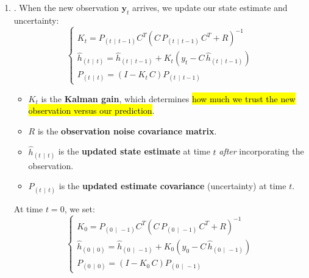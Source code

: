 \begin{enumerate}
    \item {}. When the new observation $\mathbf{y}_t$ arrives, we update our state estimate and uncertainty:
    \begin{equation}
        \begin{cases}
            K_t = P_{\left(t \, \mid \, t-1\right)} C^{T} \left( C \, P_{\left(t \, \mid \, t-1\right)} \, C^{T} + R \right)^{-1} \\[.3em]
            \hat{h}_{\left(t \, \mid \, t\right)} = \hat{h}_{\left(t \, \mid \, t-1\right)} + K_t \left( y_t - C \, \hat{h}_{\left(t \, \mid \, t-1\right)} \right) \\[.3em]
            P_{\left(t \, \mid \, t\right)} = \left( I - K_t \, C \right) P_{\left(t \, \mid \, t-1\right)}
        \end{cases}
    \end{equation}
    \begin{itemize}
        \item $K_t$ is the \textbf{Kalman gain}, which determines \hl{how much we trust the new observation versus our prediction}.
        \item $R$ is the \textbf{observation noise covariance matrix}.
        \item $\hat{h}_{\left(t \, \mid \, t\right)}$ is the \textbf{updated state estimate} at time $t$ \emph{after} incorporating the observation.
        \item $P_{\left(t \, \mid \, t\right)}$ is the \textbf{updated estimate covariance} (uncertainty) at time $t$.
    \end{itemize}
    At time $t=0$, we set:
    \begin{equation*}
        \begin{cases}
            K_0 = P_{\left(0 \, \mid \, -1\right)} C^{T} \left( C \, P_{\left(0 \, \mid \, -1\right)} \, C^{T} + R \right)^{-1} \\[.3em]
            \hat{h}_{\left(0 \, \mid \, 0\right)} = \hat{h}_{\left(0 \, \mid \, -1\right)} + K_0 \left( y_0 - C \, \hat{h}_{\left(0 \, \mid \, -1\right)} \right) \\[.3em]
            P_{\left(0 \, \mid \, 0\right)} = \left( I - K_0 \, C \right) P_{\left(0 \, \mid \, -1\right)}
        \end{cases}
    \end{equation*}
\end{enumerate}

